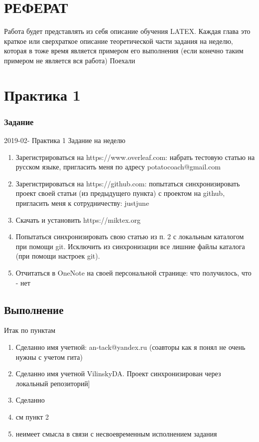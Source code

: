\documentclass[a4paper,14pt,oneside]{book}
\theoremstyle{plain} %
\theoremstyle{definition} %
\theoremstyle{remark} %
\begin{document}
\chapter*{РЕФЕРАТ}

\thispagestyle{empty}   %
Работа будет представлять из себя описание обучения LATEX. Каждая глава это краткое или сверхраткое описание теоретической части задания на неделю, которая в тоже время является примером его выполнения (если конечно таким примером не является вся работа)
Поехали

\tableofcontents
\thispagestyle{empty} 

\chapter {Практика 1}
\setcounter{page}{4}  %
\subsection{Задание}
2019-02- Практика 1 
Задание на неделю 
\begin{enumerate}
\item Зарегистрироваться на https://www.overleaf.com: набрать тестовую статью на русском языке, пригласить меня по адресу potatocoach@gmail.com 
\item Зарегистрироваться на https://github.com: попытаться синхронизировать проект своей статьи (из предыдущего пункта) с проектом на github, пригласить меня к сотрудничеству: justjune 
\item Скачать и установить https://miktex.org 
\item Попытаться синхронизировать свою статью из п. 2 с локальным каталогом при помощи git. Исключить из синхронизации все лишние файлы каталога (при помощи настроек git). 
\item Отчитаться в OneNote на своей персональной странице: что получилось, что - нет 
\end{enumerate}
\section{Выполнение}
Итак по пунктам 
\begin{enumerate}
\item Сделанно имя учетной: an-tack@yandex.ru (соавторы как я понял не очень нужны с учетом гита)
\item Сделанно имя учетной VilinskyDA. Проект синхронизирован через локальный репозиторий]
\item Сделанно
\item см пункт 2
\item неимеет смысла в связи с несвоевременным исполнением задания
\end{enumerate}
\end{document}
